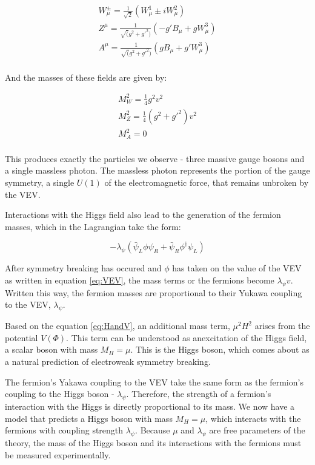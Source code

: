 \begin{equation}
\begin{gathered}
  \label{eq:EWKfields}
  W^\pm_\mu = \frac{1}{\sqrt{2}}(W^1_\mu \pm i W^2_\mu) \\
  Z^\mu = \frac{1}{\sqrt(g^2+g'^2)}(-g'B_\mu + gW^3_\mu) \\
  A^\mu = \frac{1}{\sqrt(g^2+g'^2)}(gB_\mu + g'W^3_\mu) \\
\end{gathered}
\end{equation}

And the masses of these fields are given by:

\begin{equation}
\begin{gathered}
  \label{eq:EWKmasses}
  M^2_W = \frac{1}{4}g^2v^2 \\
  M^2_Z = \frac{1}{4}(g^2+g'^2)v^2 \\
  M^2_A = 0 \\
\end{gathered}
\end{equation}

This produces exactly the particles we observe - three massive gauge bosons and a single massless photon. The massless photon represents the portion of the gauge symmetry, a single $U(1)$ of the electromagnetic force, that remains unbroken by the VEV.

Interactions with the Higgs field also lead to the generation of the fermion masses, which in the Lagrangian take the form:

\begin{equation}
  \label{eq:Lfermion}
  -\lambda_\psi (\bar{\psi}_L \phi \psi_R + \bar{\psi}_R \phi^\dagger \psi_L)
\end{equation}

After symmetry breaking has occured and $\phi$ has taken on the value of the VEV as written in equation \ref{eq:VEV}, the mass terms or the fermions become $\lambda_\psi v$. Written this way, the fermion masses are proportional to their Yukawa coupling to the VEV, $\lambda_\psi$. 

Based on the equation \ref{eq:HandV}, an additional mass term, $\mu^2H^2$ arises from the potential $V(\Phi)$. This term can be understood as anexcitation of the Higgs field, a scalar boson with mass $M_H = \mu$. This is the Higgs boson, which comes about as a natural prediction of electroweak symmetry breaking. 

The fermion's Yakawa coupling to the VEV take the same form as the fermion's coupling to the Higgs boson - $\lambda_\psi$. Therefore, the strength of a fermion's interaction with the Higgs is directly proportional to its mass. We now have a model that predicts a Higgs boson with mass $M_H = \mu$, which interacts with the fermions with coupling strength $\lambda_\psi$. Because $\mu$ and $\lambda_\psi$ are free parameters of the theory, the mass of the Higgs boson and its interactions with the fermions must be measured experimentally. 

